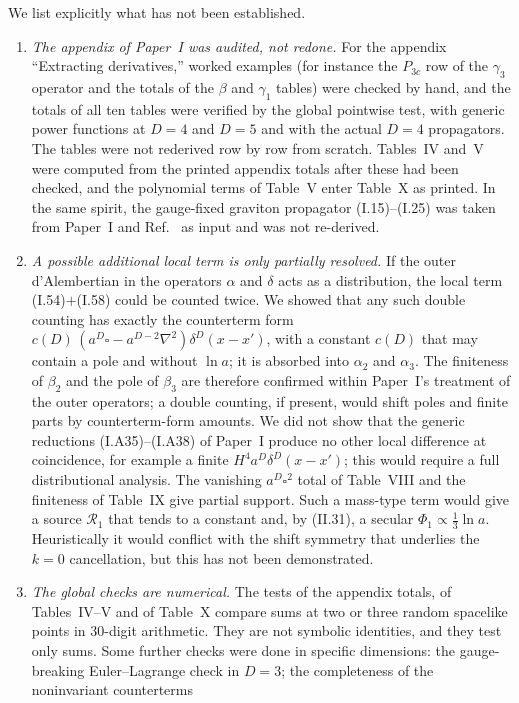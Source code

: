 \documentclass[aps,prd,onecolumn,10pt,nofootinbib,floatfix]{revtex4-2}
\newcommand{\eqI}[1]{(I.#1)}
\newcommand{\eqII}[1]{(II.#1)}
\begin{document}
We list explicitly what has not been established.
\begin{enumerate}
\item \emph{The appendix of Paper~I was audited, not redone.} For the appendix ``Extracting derivatives,'' worked examples (for
instance the $P_{3c}$ row of the $\gamma_3$ operator and the totals of the $\beta$ and $\gamma_1$ tables) were checked by hand, and the
totals of all ten tables were verified by the global pointwise test, with generic power functions at $D=4$ and $D=5$ and with the
actual $D=4$ propagators. The tables were not rederived row by row from scratch. Tables~IV and~V were computed from the printed
appendix totals after these had been checked, and the polynomial terms of Table~V enter Table~X as printed. In the same spirit, the
gauge-fixed graviton propagator \eqI{15}--\eqI{25} was taken from Paper~I and Ref.~\cite{ref:Tsamis1994} as input and was not
re-derived.
\item \emph{A possible additional local term is only partially resolved.} If the outer d'Alembertian in the operators $\alpha$ and
$\delta$ acts as a distribution, the local term \eqI{54}$+$\eqI{58} could be counted twice. We showed that any such double counting
has exactly the counterterm form $c(D)\,(a^D\square-a^{D-2}\nabla^2)\delta^D(x-x')$, with a constant $c(D)$ that may contain a pole and
without $\ln a$; it is absorbed into $\alpha_2$ and $\alpha_3$. The finiteness of $\beta_2$ and the pole of $\beta_3$ are therefore
confirmed within Paper~I's treatment of the outer operators; a double counting, if present, would shift poles and finite parts by
counterterm-form amounts. We did not show that the generic reductions \eqI{A35}--\eqI{A38} of Paper~I produce no other local difference
at coincidence, for example a finite $H^4a^D\delta^D(x-x')$; this would require a full distributional analysis. The vanishing
$a^D\square^2$ total of Table~VIII and the finiteness of Table~IX give partial support. Such a mass-type term would give a source
$\mathcal R_1$ that tends to a constant and, by \eqII{31}, a secular $\Phi_1\propto\frac13\ln a$. Heuristically it would conflict with
the shift symmetry that underlies the $k=0$ cancellation, but this has not been demonstrated.
\item \emph{The global checks are numerical.} The tests of the appendix totals, of Tables~IV--V and of Table~X compare sums at two or
three random spacelike points in 30-digit arithmetic. They are not symbolic identities, and they test only sums. Some further checks
were done in specific dimensions: the gauge-breaking Euler--Lagrange check in $D=3$; the completeness of the noninvariant counterterms

\end{enumerate}
\end{document}
